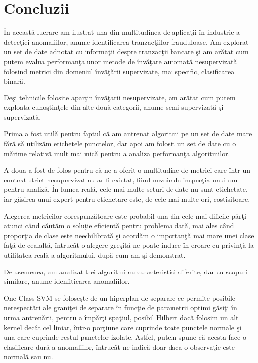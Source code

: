 \chapter{Concluzii}

În această lucrare am ilustrat una din multitudinea de aplicaţii în industrie a 
detecţiei anomaliilor, anume identificarea tranzacţiilor frauduloase. Am explorat un 
set de date adnotat cu informaţii despre tranzacţii bancare şi am arătat cum putem evalua
performanţa unor metode de învăţare automată nesupervizată folosind metrici din domeniul 
învăţării supervizate, mai specific, clasificarea binară.

Deşi tehnicile folosite aparţin învăţarii nesupervizate, am arătat cum putem exploata
cunoştinţele din alte două categorii, anume semi-supervizată şi supervizată. 

Prima a fost 
utilă pentru faptul că am antrenat algoritmi pe un set de date mare fără să utilizăm 
etichetele punctelor, dar apoi am folosit un set de date cu o mărime relativă mult mai mică
pentru a analiza performanţa algoritmilor. 

A doua a fost de folos pentru că ne-a oferit 
o multitudine de metrici care într-un context strict nesupervizat nu ar fi existat, fiind 
nevoie de inspecţia unui om pentru analiză. În lumea reală, cele mai multe seturi de date
nu sunt etichetate, iar găsirea unui expert pentru etichetare este, 
de cele mai multe ori,
costisitoare.

Alegerea metricilor corespunzătoare
este probabil una din cele mai dificile părţi atunci când căutăm o soluţie eficientă pentru 
problema dată, mai ales când proporţia de clase este neechilibrată şi acordăm o importanţă mai 
mare unei clase faţă de cealaltă, întrucât o alegere greşită ne poate induce în eroare cu privinţă
la utilitatea reală a algoritmului, după cum am şi demonstrat.

De asemenea, am analizat trei algoritmi cu caracteristici diferite, dar cu 
scopuri similare, anume idenfiticarea anomaliilor.

One Class SVM se 
foloseşte de un hiperplan de separare
ce permite posibile nerespectări ale graniţei
de separare în funcţie de parametrii optimi găsiţi în urma antrenării,
pentru a împărţi spaţiul, posibil Hilbert dacă folosim un alt kernel decât cel 
liniar, într-o porţiune 
care cuprinde toate punctele normale şi una care cuprinde restul punctelor izolate. Astfel,
putem spune că acesta face o clasificare dură a anomaliilor, întrucât ne indică doar daca
o observaţie este normală sau nu. 

